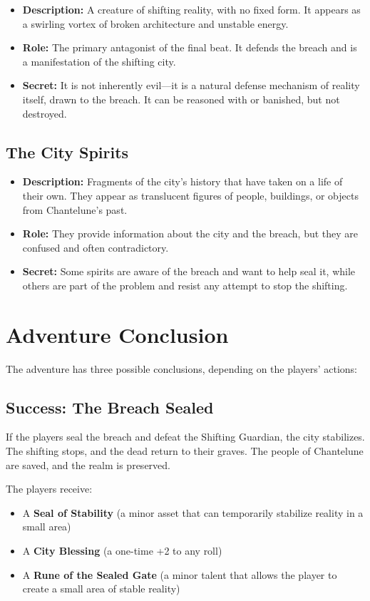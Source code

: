 \documentclass{article}
\begin{document}
\begin{itemize}
    \item \textbf{Description:} A creature of shifting reality, with no fixed form. It appears as a swirling vortex of broken architecture and unstable energy.
    \item \textbf{Role:} The primary antagonist of the final beat. It defends the breach and is a manifestation of the shifting city.
    \item \textbf{Secret:} It is not inherently evil---it is a natural defense mechanism of reality itself, drawn to the breach. It can be reasoned with or banished, but not destroyed.
\end{itemize}

\subsection{The City Spirits}

\begin{itemize}
    \item \textbf{Description:} Fragments of the city's history that have taken on a life of their own. They appear as translucent figures of people, buildings, or objects from Chantelune's past.
    \item \textbf{Role:} They provide information about the city and the breach, but they are confused and often contradictory.
    \item \textbf{Secret:} Some spirits are aware of the breach and want to help seal it, while others are part of the problem and resist any attempt to stop the shifting.
\end{itemize}

\section{Adventure Conclusion}

The adventure has three possible conclusions, depending on the players' actions:

\subsection{Success: The Breach Sealed}

If the players seal the breach and defeat the Shifting Guardian, the city stabilizes. The shifting stops, and the dead return to their graves. The people of Chantelune are saved, and the realm is preserved.

The players receive:
\begin{itemize}
    \item A \textbf{Seal of Stability} (a minor asset that can temporarily stabilize reality in a small area)
    \item A \textbf{City Blessing} (a one-time +2 to any roll)
    \item A \textbf{Rune of the Sealed Gate} (a minor talent that allows the player to create a small area of stable reality)
\end{itemize}
\end{document}
